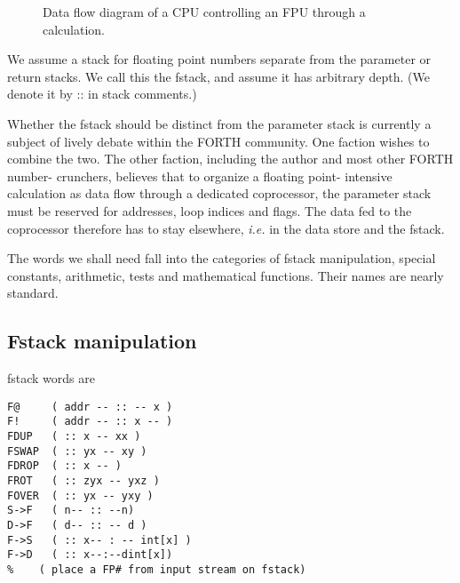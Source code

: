 \begin{figure}
    \caption{Data flow diagram of a CPU controlling an FPU through a calculation.}
    \label{fig:03_01}
\end{figure}

We assume a stack for floating point numbers separate from the 
parameter or return stacks. We call this the fstack, and assume it
has arbitrary depth. (We denote it by :: in stack comments.)

\leftbar[1\linewidth] \noindent
Whether the fstack should be distinct from the parameter stack
is currently a subject of lively debate within the FORTH community. 
One faction wishes to combine the two. The other
faction, including the author and most other FORTH number-
crunchers, believes that to organize a floating point- intensive
calculation as data flow through a dedicated coprocessor, the
parameter stack must be reserved for addresses, loop indices and
flags. The data fed to the coprocessor therefore has to stay
elsewhere, \textit{i.e.} in the data store and the fstack.
\endleftbar

The words we shall need fall into the categories of fstack 
manipulation, special constants, arithmetic, tests and mathematical functions.
Their names are nearly standard.

\subsection{Fstack manipulation}
 fstack words are
\begin{verbatim}
F@     ( addr -- :: -- x )
F!     ( addr -- :: x -- )
FDUP   ( :: x -- xx )
FSWAP  ( :: yx -- xy )
FDROP  ( :: x -- )
FROT   ( :: zyx -- yxz )
FOVER  ( :: yx -- yxy )
S->F   ( n-- :: --n)
D->F   ( d-- :: -- d )
F->S   ( :: x-- : -- int[x] )
F->D   ( :: x--:--dint[x])
%    ( place a FP# from input stream on fstack)
\end{verbatim}
 
